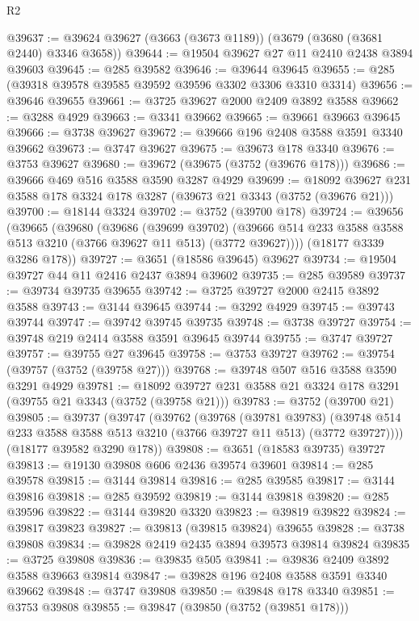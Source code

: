 \begin{lexlean}{R2}
\begin{coremodule}
@39637 := @39624 @39627 (@3663 (@3673 @1189)) (@3679 (@3680 (@3681 @2440) @3346 @3658))
@39644 := @19504 @39627 @27 @11 @2410 @2438 @3894 @39603
@39645 := @285 @39582
@39646 := @39644 @39645
@39655 := @285 (@39318 @39578 @39585 @39592 @39596 @3302 @3306 @3310 @3314)
@39656 := @39646 @39655
@39661 := @3725 @39627 @2000 @2409 @3892 @3588
@39662 := @3288 @4929
@39663 := @3341 @39662
@39665 := @39661 @39663 @39645
@39666 := @3738 @39627
@39672 := @39666 @196 @2408 @3588 @3591 @3340 @39662
@39673 := @3747 @39627
@39675 := @39673 @178 @3340
@39676 := @3753 @39627
@39680 := @39672 (@39675 (@3752 (@39676 @178)))
@39686 := @39666 @469 @516 @3588 @3590 @3287 @4929
@39699 := @18092 @39627 @231 @3588 @178 @3324 @178 @3287 (@39673 @21 @3343 (@3752 (@39676 @21)))
@39700 := @18144 @3324
@39702 := @3752 (@39700 @178)
@39724 := @39656
    (@39665
      (@39680
        (@39686
          (@39699 @39702)
          (@39666 @514 @233 @3588 @3588 @513 @3210 (@3766 @39627 @11 @513) (@3772 @39627))))
      (@18177 @3339 @3286 @178))
@39727 := @3651 (@18586 @39645) @39627
@39734 := @19504 @39727 @44 @11 @2416 @2437 @3894 @39602
@39735 := @285 @39589
@39737 := @39734 @39735 @39655
@39742 := @3725 @39727 @2000 @2415 @3892 @3588
@39743 := @3144 @39645
@39744 := @3292 @4929
@39745 := @39743 @39744
@39747 := @39742 @39745 @39735
@39748 := @3738 @39727
@39754 := @39748 @219 @2414 @3588 @3591 @39645 @39744
@39755 := @3747 @39727
@39757 := @39755 @27 @39645
@39758 := @3753 @39727
@39762 := @39754 (@39757 (@3752 (@39758 @27)))
@39768 := @39748 @507 @516 @3588 @3590 @3291 @4929
@39781 := @18092 @39727 @231 @3588 @21 @3324 @178 @3291 (@39755 @21 @3343 (@3752 (@39758 @21)))
@39783 := @3752 (@39700 @21)
@39805 := @39737
    (@39747
      (@39762
        (@39768
          (@39781 @39783)
          (@39748 @514 @233 @3588 @3588 @513 @3210 (@3766 @39727 @11 @513) (@3772 @39727))))
      (@18177 @39582 @3290 @178))
@39808 := @3651 (@18583 @39735) @39727
@39813 := @19130 @39808 @606 @2436 @39574 @39601
@39814 := @285 @39578
@39815 := @3144 @39814
@39816 := @285 @39585
@39817 := @3144 @39816
@39818 := @285 @39592
@39819 := @3144 @39818
@39820 := @285 @39596
@39822 := @3144 @39820 @3320
@39823 := @39819 @39822
@39824 := @39817 @39823
@39827 := @39813 (@39815 @39824) @39655
@39828 := @3738 @39808
@39834 := @39828 @2419 @2435 @3894 @39573 @39814 @39824
@39835 := @3725 @39808
@39836 := @39835 @505
@39841 := @39836 @2409 @3892 @3588 @39663 @39814
@39847 := @39828 @196 @2408 @3588 @3591 @3340 @39662
@39848 := @3747 @39808
@39850 := @39848 @178 @3340
@39851 := @3753 @39808
@39855 := @39847 (@39850 (@3752 (@39851 @178)))

\end{coremodule}
\end{lexlean}
